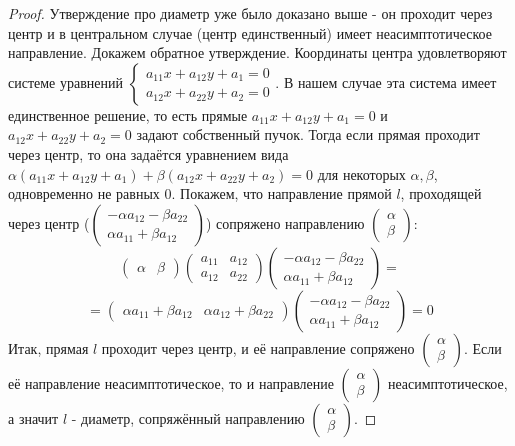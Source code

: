 \documentclass[a4paper, 12pt]{article}
\theoremstyle{definition}
\begin{document}
	\begin{proof}
		Утверждение про диаметр уже было доказано выше - он проходит через центр и в центральном случае (центр единственный) имеет неасимптотическое направление.
		Докажем обратное утверждение. Координаты центра удовлетворяют системе уравнений $\begin{cases}
			a_{11}x+a_{12}y+a_1=0\\
			a_{12}x+a_{22}y+a_2=0
		\end{cases}$. В нашем случае эта система имеет единственное решение, то есть прямые $a_{11}x+a_{12}y+a_1=0$ и $a_{12}x+a_{22}y+a_2=0$ задают собственный пучок. Тогда если прямая проходит через центр, то она задаётся уравнением вида $\alpha(a_{11}x+a_{12}y+a_1) + \beta(a_{12}x+a_{22}y+a_2) = 0$ для некоторых $\alpha, \beta$, одновременно не равных 0. Покажем, что направление прямой $l$, проходящей через центр ($\begin{pmatrix} -\alpha a_{12} - \beta a_{22} \\ \alpha a_{11} + \beta a_{12} \end{pmatrix}$) сопряжено направлению $\begin{pmatrix} \alpha \\ \beta \end{pmatrix}$: $$\begin{pmatrix} \alpha & \beta \end{pmatrix}\begin{pmatrix}a_{11}&a_{12}\\a_{12}&a_{22}\end{pmatrix}\begin{pmatrix} -\alpha a_{12} - \beta a_{22} \\ \alpha a_{11} + \beta a_{12} \end{pmatrix} = $$ $$=\begin{pmatrix} \alpha a_{11} + \beta a_{12} & \alpha a_{12} + \beta a_{22} \end{pmatrix}\begin{pmatrix} -\alpha a_{12} - \beta a_{22} \\ \alpha a_{11} + \beta a_{12} \end{pmatrix} = 0 $$
		Итак, прямая $l$ проходит через центр, и её направление сопряжено $\begin{pmatrix} \alpha \\ \beta \end{pmatrix}$. Если её направление неасимптотическое, то и направление $\begin{pmatrix} \alpha \\ \beta \end{pmatrix}$ неасимптотическое, а значит $l$ - диаметр, сопряжённый направлению $\begin{pmatrix} \alpha \\ \beta \end{pmatrix}$.
	\end{proof}
\end{document}
